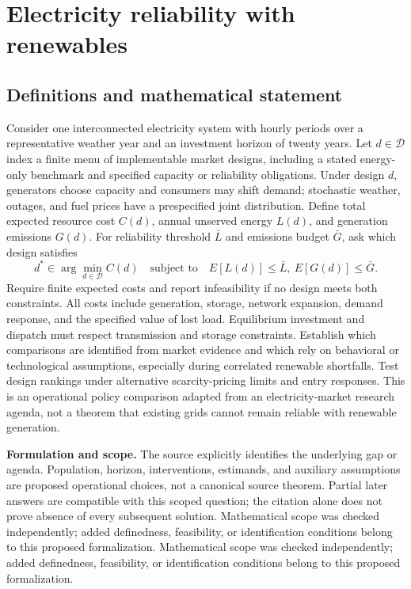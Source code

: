 \documentclass[11pt]{article}
\begin{document}
\section*{Electricity reliability with renewables}\label{30007719}
\subsection{Definitions and mathematical statement}
Consider one interconnected electricity system with hourly periods over a representative weather year and an investment horizon of twenty years. Let \(d\in\mathcal D\) index a finite menu of implementable market designs, including a stated energy-only benchmark and specified capacity or reliability obligations. Under design \(d\), generators choose capacity and consumers may shift demand; stochastic weather, outages, and fuel prices have a prespecified joint distribution. Define total expected resource cost \(C(d)\), annual unserved energy \(L(d)\), and generation emissions \(G(d)\). For reliability threshold \(\bar L\) and emissions budget \(\bar G\), ask which design satisfies
\[d^*\in\arg\min_{d\in\mathcal D} C(d)\quad\text{subject to}\quad E[L(d)]\leq\bar L,\ E[G(d)]\leq\bar G.\]
Require finite expected costs and report infeasibility if no design meets both constraints. All costs include generation, storage, network expansion, demand response, and the specified value of lost load. Equilibrium investment and dispatch must respect transmission and storage constraints. Establish which comparisons are identified from market evidence and which rely on behavioral or technological assumptions, especially during correlated renewable shortfalls. Test design rankings under alternative scarcity-pricing limits and entry responses. This is an operational policy comparison adapted from an electricity-market research agenda, not a theorem that existing grids cannot remain reliable with renewable generation.

\par\textbf{Formulation and scope.} The source explicitly identifies the underlying gap or agenda. Population, horizon, interventions, estimands, and auxiliary assumptions are proposed operational choices, not a canonical source theorem. Partial later answers are compatible with this scoped question; the citation alone does not prove absence of every subsequent solution. Mathematical scope was checked independently; added definedness, feasibility, or identification conditions belong to this proposed formalization. Mathematical scope was checked independently; added definedness, feasibility, or identification conditions belong to this proposed formalization.
\end{document}
